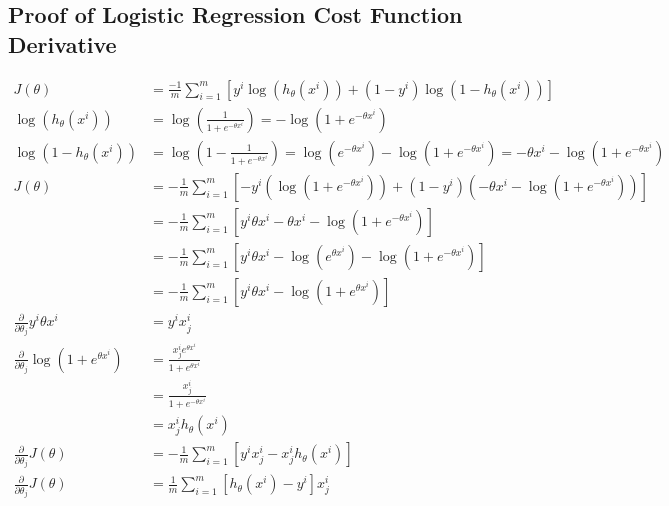 \documentclass[11pt, oneside]{article}
\begin{document}
\subsection{Proof of Logistic Regression Cost Function Derivative}
	\begin{align*}
		J(\theta) &= \frac{-1}{m} \sum^m_{i=1} [y^i\log(h_\theta(x^i)) + (1-y^i)\log(1 - h_\theta(x^i))] \\
		\log(h_\theta(x^i)) &= \log(\frac{1}{1+e^{-\theta x^i}}) = -\log(1+e^{-\theta x^i})\\
		\log(1 - h_\theta(x^i)) &= \log(1-\frac{1}{1+e^{-\theta x^i}})=\log(e^{-\theta x^i})-\log(1+e^{-\theta x^i})=-\theta x^i-\log(1+e^{-\theta x^i})\\
		J(\theta) &= -\frac{1}{m}\sum_{i=1}^m \left[-y^i(\log(1+e^{-\theta x^i})) + (1-y^i)(-\theta x^i-\log(1+e^{-\theta x^i}))\right]\\
		&= -\frac{1}{m}\sum_{i=1}^m \left[y^i\theta x^i - \theta x^i - \log(1+e^{-\theta x^i})\right]\\
		&= -\frac{1}{m}\sum_{i=1}^m \left[y^i\theta x^i -\log(e^{\theta x^i}) - \log(1 + e^{-\theta x^i})\right]\\
		&=-\frac{1}{m}\sum_{i=1}^m \left[y^i\theta x^i - \log(1+e^{\theta x^i})\right]\\
		\frac{\partial}{\partial \theta_j}y^i\theta x^i &= y^i x^i_j\\
		\frac{\partial}{\partial \theta_j}\log(1+e^{\theta x^i}) &= \frac{x^i_je^{\theta x^i}}{1+e^{\theta x^i}}\\
		&= \frac{{x^i_j}}{{1+e^{-\theta x^i}}}\\
		&= x^i_jh_\theta(x^i)\\
		\frac{\partial}{\partial \theta_j}J(\theta) &= -\frac{1}{m}\sum_{i=1}^m \left[y^i x^i_j - x^i_jh_\theta(x^i)\right]\\
		\frac{\partial}{\partial \theta_j}J(\theta) &= \frac{1}{m}\sum_{i=1}^m \left[h_\theta(x^i) - y^i\right]x^i_j
	\end{align*}
\end{document}
